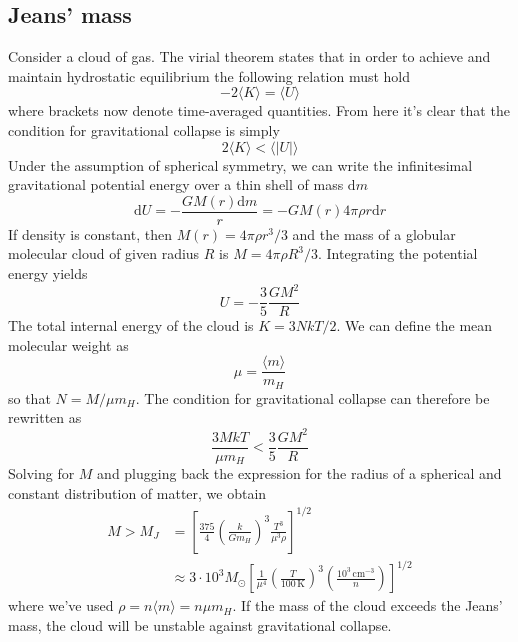 \subsection{Jeans' mass}
Consider a cloud of gas. The virial theorem states that in order to achieve and maintain hydrostatic equilibrium the following relation must hold 
\begin{equation}
    -2\langle K\rangle = \langle U\rangle
    \label{eq:virial_th}
\end{equation}
where brackets now denote time-averaged quantities. From here it's clear that the condition for gravitational collapse is simply 
\begin{equation*}
    2\langle K\rangle < \langle |U|\rangle
\end{equation*}
Under the assumption of spherical symmetry, we can write the infinitesimal gravitational potential energy over a thin shell of mass $\text{d}m$
\begin{equation*}
    \text{d}U = -\frac{GM(r)\text{d}m}{r} = -GM(r)4\pi\rho r\text{d}r
\end{equation*}
If density is constant, then $M(r) = 4\pi\rho r^{3}/3$ and the mass of a globular molecular cloud of given radius $R$ is $M = 4\pi\rho R^{3}/3$. Integrating the potential energy yields 
\begin{equation*}
    U = -\frac{3}{5}\frac{GM^{2}}{R}
\end{equation*}
The total internal energy of the cloud is $K = 3NkT/2$. We can define the mean molecular weight as 
\begin{equation*}
    \mu = \frac{\langle m \rangle}{m_{H}}
\end{equation*}
so that $N = M/\mu m_{H}$. The condition for gravitational collapse can therefore be rewritten as 
\begin{equation*}
    \frac{3MkT}{\mu m_{H}} < \frac{3}{5}\frac{GM^{2}}{R}
\end{equation*}
Solving for $M$ and plugging back the expression for the radius of a spherical and constant distribution of matter, we obtain 
\begin{align}
    M > M_{J} &= \left[\frac{375}{4}\left(\frac{k}{Gm_{H}}\right)^{3}\frac{T^{3}}{\mu^{3}\rho}\right]^{1/2} \\
    &\approx 3\cdot 10^{3}M_{\odot}\left[\frac{1}{\mu^{4}}\left(\frac{T}{100\,\text{K}}\right)^{3}\left(\frac{10^{3}\,\text{cm}^{-3}}{n}\right)\right]^{1/2}
    \label{eq:jeans_mass}
\end{align}
where we've used $\rho = n\langle m \rangle = n\mu m_{H}$. If the mass of the cloud exceeds the Jeans' mass, the cloud will be unstable against gravitational collapse.
